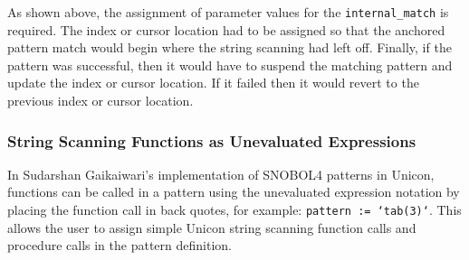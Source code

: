\documentclass{article}
\begin{document}
As shown above, the assignment of parameter values for the \texttt{internal\_match} is required. The index or cursor location had to be assigned so that the anchored pattern match would begin where the string scanning had left off.  Finally, if the pattern was successful, then it would have to suspend the matching pattern and update the index or cursor location.  If it failed then it would revert to the previous index or cursor location.  

\subsubsection{String Scanning Functions as Unevaluated Expressions}
In Sudarshan Gaikaiwari's implementation of SNOBOL4 patterns in Unicon, functions can be called in a pattern using the unevaluated expression notation by placing the function call in back quotes, for example: \texttt{pattern := `tab(3)`}.  This allows the user to assign simple Unicon string scanning function calls and procedure calls in the pattern definition. 
\end{document}
